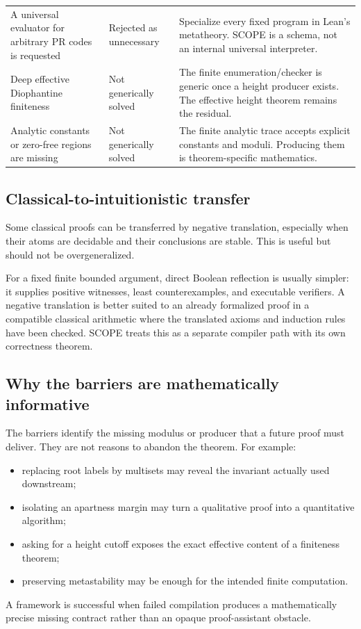 \begin{longtable}{@{}p{}p{}p{}@{}}
A universal evaluator for arbitrary PR codes is requested & Rejected as unnecessary & Specialize every fixed program in Lean's metatheory.  SCOPE is a schema, not an internal universal interpreter. \\

Deep effective Diophantine finiteness & Not generically solved & The finite enumeration/checker is generic once a height producer exists.  The effective height theorem remains the residual. \\

Analytic constants or zero-free regions are missing & Not generically solved & The finite analytic trace accepts explicit constants and moduli.  Producing them is theorem-specific mathematics. \\
\bottomrule
\end{longtable}
\normalsize

\subsection{Classical-to-intuitionistic transfer}

Some classical proofs can be transferred by negative translation, especially when their atoms are decidable and their conclusions are stable.  This is useful but should not be overgeneralized.

For a fixed finite bounded argument, direct Boolean reflection is usually simpler: it supplies positive witnesses, least counterexamples, and executable verifiers.  A negative translation is better suited to an already formalized proof in a compatible classical arithmetic where the translated axioms and induction rules have been checked.  SCOPE treats this as a separate compiler path with its own correctness theorem.

\subsection{Why the barriers are mathematically informative}

The barriers identify the missing modulus or producer that a future proof must deliver.  They are not reasons to abandon the theorem.  For example:

\begin{itemize}
\item replacing root labels by multisets may reveal the invariant actually used downstream;
\item isolating an apartness margin may turn a qualitative proof into a quantitative algorithm;
\item asking for a height cutoff exposes the exact effective content of a finiteness theorem;
\item preserving metastability may be enough for the intended finite computation.
\end{itemize}

A framework is successful when failed compilation produces a mathematically precise missing contract rather than an opaque proof-assistant obstacle.
